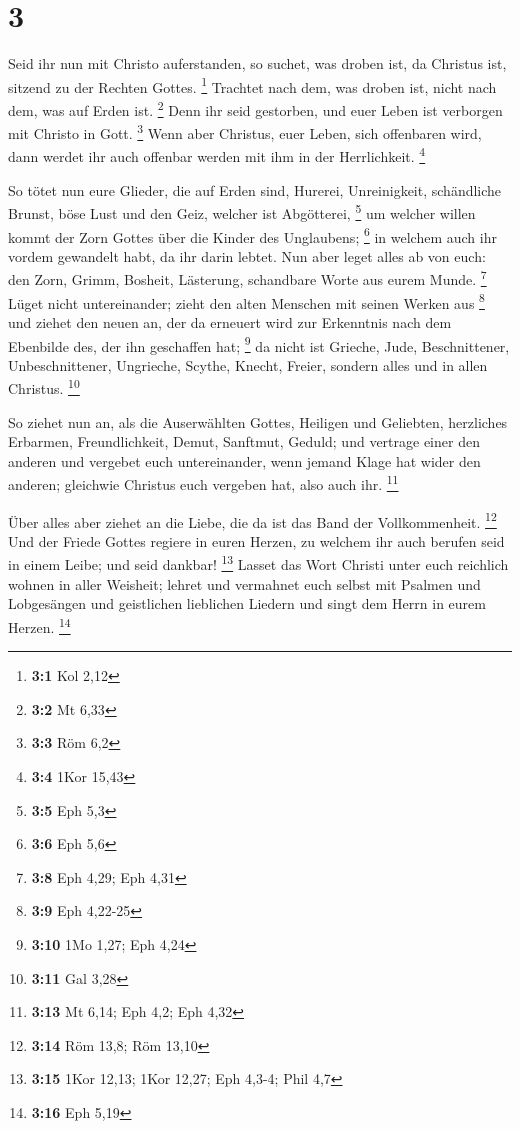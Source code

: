 \hypertarget{section-1}{%
\section{3}\label{section-1}}

 Seid ihr nun mit Christo auferstanden, so suchet, was
droben ist, da Christus ist, sitzend zu der Rechten Gottes. \footnote{\textbf{3:1}
  Kol 2,12}  Trachtet nach dem, was droben ist, nicht nach
dem, was auf Erden ist. \footnote{\textbf{3:2} Mt 6,33} 
Denn ihr seid gestorben, und euer Leben ist verborgen mit Christo in
Gott. \footnote{\textbf{3:3} Röm 6,2}  Wenn aber Christus,
euer Leben, sich offenbaren wird, dann werdet ihr auch offenbar werden
mit ihm in der Herrlichkeit. \footnote{\textbf{3:4} 1Kor 15,43}

 So tötet nun eure Glieder, die auf Erden sind, Hurerei,
Unreinigkeit, schändliche Brunst, böse Lust und den Geiz, welcher ist
Abgötterei, \footnote{\textbf{3:5} Eph 5,3}  um welcher
willen kommt der Zorn Gottes über die Kinder des Unglaubens; \footnote{\textbf{3:6}
  Eph 5,6}  in welchem auch ihr vordem gewandelt habt, da
ihr darin lebtet.  Nun aber leget alles ab von euch: den
Zorn, Grimm, Bosheit, Lästerung, schandbare Worte aus eurem Munde.
\footnote{\textbf{3:8} Eph 4,29; Eph 4,31}  Lüget nicht
untereinander; zieht den alten Menschen mit seinen Werken aus
\footnote{\textbf{3:9} Eph 4,22-25}  und ziehet den neuen
an, der da erneuert wird zur Erkenntnis nach dem Ebenbilde des, der ihn
geschaffen hat; \footnote{\textbf{3:10} 1Mo 1,27; Eph 4,24}
 da nicht ist Grieche, Jude, Beschnittener,
Unbeschnittener, Ungrieche, Scythe, Knecht, Freier, sondern alles und in
allen Christus. \footnote{\textbf{3:11} Gal 3,28}

 So ziehet nun an, als die Auserwählten Gottes, Heiligen
und Geliebten, herzliches Erbarmen, Freundlichkeit, Demut, Sanftmut,
Geduld;  und vertrage einer den anderen und vergebet euch
untereinander, wenn jemand Klage hat wider den anderen; gleichwie
Christus euch vergeben hat, also auch ihr. \footnote{\textbf{3:13} Mt
  6,14; Eph 4,2; Eph 4,32}

 Über alles aber ziehet an die Liebe, die da ist das Band
der Vollkommenheit. \footnote{\textbf{3:14} Röm 13,8; Röm 13,10}
 Und der Friede Gottes regiere in euren Herzen, zu
welchem ihr auch berufen seid in einem Leibe; und seid dankbar!
\footnote{\textbf{3:15} 1Kor 12,13; 1Kor 12,27; Eph 4,3-4; Phil 4,7}
 Lasset das Wort Christi unter euch reichlich wohnen in
aller Weisheit; lehret und vermahnet euch selbst mit Psalmen und
Lobgesängen und geistlichen lieblichen Liedern und singt dem Herrn in
eurem Herzen. \footnote{\textbf{3:16} Eph 5,19}

